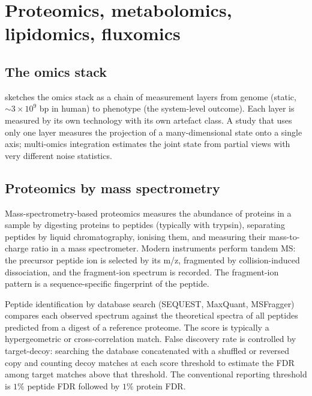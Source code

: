 \section{Proteomics, metabolomics, lipidomics, fluxomics}

\subsection{The omics stack}

 sketches the omics stack as a chain
of measurement layers from genome (static, $\sim 3 \times 10^9$ bp in
human) to phenotype (the system-level outcome). Each layer is
measured by its own technology with its own artefact class. A study
that uses only one layer measures the projection of a many-dimensional
state onto a single axis; multi-omics integration estimates the joint
state from partial views with very different noise statistics.



\subsection{Proteomics by mass spectrometry}

Mass-spectrometry-based proteomics \cite{paper:v6c11-aebersold-proteomics-2003}
measures the abundance of proteins in a sample by digesting proteins to
peptides (typically with trypsin), separating peptides by
liquid chromatography, ionising them, and measuring their mass-to-charge
ratio in a mass spectrometer. Modern instruments perform tandem MS:
the precursor peptide ion is selected by its m/z, fragmented by
collision-induced dissociation, and the fragment-ion spectrum is
recorded. The fragment-ion pattern is a sequence-specific fingerprint
of the peptide.

Peptide identification by database search (SEQUEST, MaxQuant, MSFragger)
compares each observed spectrum against the theoretical spectra of all
peptides predicted from a digest of a reference proteome. The score is
typically a hypergeometric or cross-correlation match. False discovery
rate is controlled by target-decoy: searching the database concatenated
with a shuffled or reversed copy and counting decoy matches at each
score threshold to estimate the FDR among target matches above that
threshold. The conventional reporting threshold is $1\%$ peptide FDR
followed by $1\%$ protein FDR.

